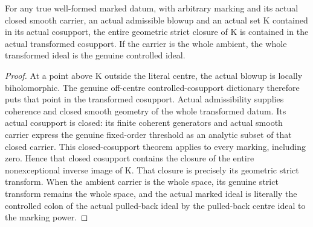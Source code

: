 \begin{lemma}
\label{hir:general-nc-controlled-strict-closure-cosupport}
\leanok
For any true well-formed marked datum, with arbitrary marking and its actual
closed smooth carrier, an actual admissible blowup and an actual set K contained
in its actual cosupport, the entire geometric strict closure of K is contained
in the actual transformed cosupport. If the carrier is the whole ambient,
the whole transformed ideal is the genuine controlled ideal.
\end{lemma}
\begin{proof}
At a point above K outside the literal centre, the actual blowup is locally
biholomorphic. The genuine off-centre controlled-cosupport dictionary therefore
puts that point in the transformed cosupport. Actual admissibility supplies
coherence and closed smooth geometry of the whole transformed datum. Its actual
cosupport is closed: its finite coherent generators and actual smooth carrier
express the genuine fixed-order threshold as an analytic subset of that closed
carrier. This closed-cosupport theorem applies to every marking, including zero.
Hence that closed cosupport contains the
closure of the entire nonexceptional inverse image of K. That closure is
precisely its geometric strict transform. When the ambient carrier is the whole
space, its genuine strict transform remains the whole space, and the actual
marked ideal is literally the controlled colon of the actual pulled-back ideal
by the pulled-back centre ideal to the marking power.
\end{proof}

